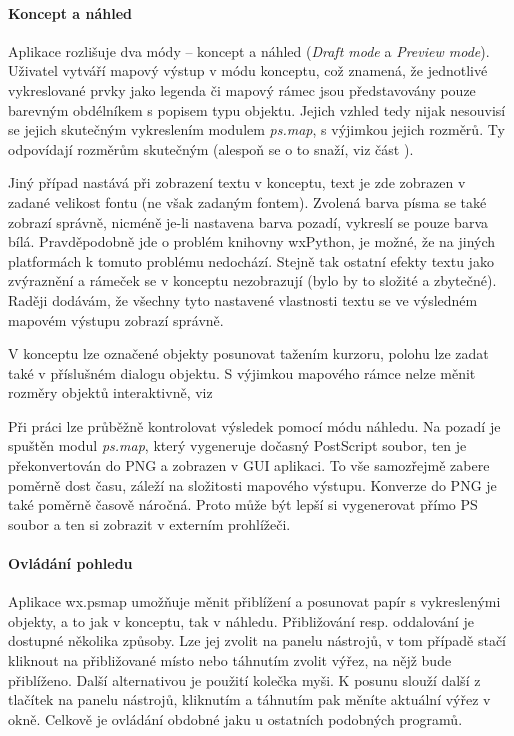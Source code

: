 \documentclass[a4paper,12pt,draft]{article}
\newcommand{\modul}[1]{\emph{#1}}
\begin{document}
\paragraph*{Koncept a náhled}
Aplikace rozlišuje dva módy -- koncept a náhled (\emph{Draft mode} a \emph{Preview mode}). 
Uživatel vytváří mapový výstup v módu konceptu, což znamená, že jednotlivé vykreslované prvky jako legenda či mapový rámec jsou představovány pouze barevným obdélníkem s popisem typu objektu. Jejich vzhled tedy nijak nesouvisí se jejich skutečným vykreslením modulem \modul{ps.map}, s výjimkou jejich rozměrů. Ty odpovídají rozměrům skutečným (alespoň se o to snaží, viz část ).

Jiný případ nastává při zobrazení textu v konceptu, text je zde zobrazen v zadané velikost fontu (ne však zadaným fontem). Zvolená barva písma se také zobrazí správně, nicméně je-li nastavena barva pozadí, vykreslí se pouze barva bílá. Pravděpodobně jde o problém knihovny wxPython, je možné, že na jiných platformách k tomuto problému nedochází. Stejně tak ostatní efekty textu jako zvýraznění a rámeček se v konceptu nezobrazují (bylo by to složité a zbytečné). Raději dodávám, že všechny tyto nastavené vlastnosti textu se ve výsledném mapovém výstupu zobrazí správně.

V konceptu lze označené objekty posunovat tažením kurzoru, polohu lze zadat také v příslušném dialogu objektu. S výjimkou mapového rámce nelze měnit rozměry objektů interaktivně, viz 

Při práci lze průběžně kontrolovat výsledek pomocí módu náhledu. Na pozadí je spuštěn modul \modul{ps.map}, který vygeneruje dočasný PostScript soubor, ten je překonvertován do PNG a zobrazen v GUI aplikaci. To vše samozřejmě zabere poměrně dost času, záleží na složitosti mapového výstupu. Konverze do PNG je také poměrně časově náročná. Proto může být lepší si vygenerovat přímo PS soubor a ten si zobrazit v externím prohlížeči.

\paragraph*{Ovládání pohledu}
Aplikace wx.psmap umožňuje měnit přiblížení a posunovat papír s vykreslenými objekty, a to jak v konceptu, tak v náhledu. Přibližování resp. oddalování je dostupné několika způsoby. Lze jej zvolit na panelu nástrojů, v tom případě stačí kliknout na přibližované místo nebo táhnutím zvolit výřez, na nějž bude přiblíženo. Další alternativou je použití kolečka myši. K posunu slouží další z tlačítek na panelu nástrojů, kliknutím a táhnutím pak měníte aktuální výřez v okně. Celkově je ovládání obdobné jaku u ostatních podobných programů.
\end{document}
